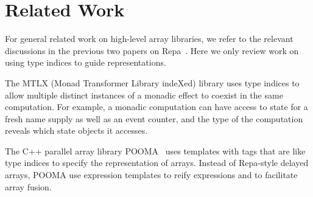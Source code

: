 
\section{Related Work}

For general related work on high-level array libraries, we refer to the relevant discussions in the previous two papers on Repa~\cite{Keller:Repa, Lippmeier:Stencil}. Here we only review work on using type indices to guide representations.

The MTLX (Monad Transformer Library indeXed) library \cite{Snyder:TypeIndexedMonads} uses type indices to allow multiple distinct instances of a monadic effect to coexist in the same computation. For example, a monadic computation can have access to state for a fresh name supply as well as an event counter, and the type of the computation reveals which state objects it accesses.

The C++ parallel array library POOMA~\cite{reynders-eal:pooma} uses templates with tags that are like type indices to specify the representation of arrays.  Instead of Repa-style delayed arrays, POOMA use expression templates to reify expressions and to facilitate array fusion.